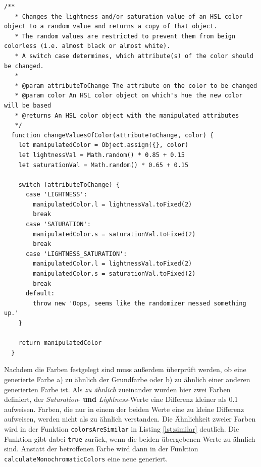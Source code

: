 \begin{lstlisting}[caption=Setzen der HSL-Werte, label=lst:hsl]
  /**
   * Changes the lightness and/or saturation value of an HSL color object to a random value and returns a copy of that object.
   * The random values are restricted to prevent them from beign colorless (i.e. almost black or almost white).
   * A switch case determines, which attribute(s) of the color should be changed.
   *
   * @param attributeToChange The attribute on the color to be changed
   * @param color An HSL color object on which's hue the new color will be based
   * @returns An HSL color object with the manipulated attributes
   */
  function changeValuesOfColor(attributeToChange, color) {
    let manipulatedColor = Object.assign({}, color)
    let lightnessVal = Math.random() * 0.85 + 0.15
    let saturationVal = Math.random() * 0.65 + 0.15

    switch (attributeToChange) {
      case 'LIGHTNESS':
        manipulatedColor.l = lightnessVal.toFixed(2)
        break
      case 'SATURATION':
        manipulatedColor.s = saturationVal.toFixed(2)
        break
      case 'LIGHTNESS_SATURATION':
        manipulatedColor.l = lightnessVal.toFixed(2)
        manipulatedColor.s = saturationVal.toFixed(2)
        break
      default:
        throw new 'Oops, seems like the randomizer messed something up.'
    }

    return manipulatedColor
  }
\end{lstlisting}

Nachdem die Farben festgelegt sind muss außerdem überprüft werden, ob  eine generierte Farbe a) zu ähnlich der Grundfarbe oder b) zu ähnlich einer anderen generierten Farbe ist.
Als \textit{zu ähnlich} zueinander wurden hier zwei Farben definiert, der \textit{Saturation}- \textbf{und} \textit{Lightness}-Werte eine Differenz kleiner als 0.1 aufweisen. Farben, die nur in einem der beiden Werte eine zu kleine Differenz aufweisen, werden nicht als zu ähnlich verstanden.
Die Ähnlichkeit zweier Farben wird in  der Funktion \texttt{colorsAreSimilar} in Listing \ref{lst:similar} deutlich. Die Funktion gibt dabei \texttt{true} zurück, wenn die beiden übergebenen Werte zu ähnlich sind. Anstatt der betroffenen Farbe wird dann in der Funktion \texttt{calculateMonochromaticColors} eine neue generiert.

